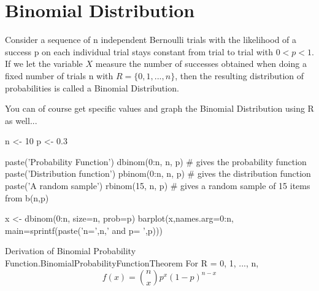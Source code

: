 \documentclass[10pt,]{book}
\numberwithin{equation}{section}
\newcommand{\lt}{<}
\begin{document}
\section[{Binomial Distribution}]{Binomial Distribution}\label{section-46}
\hypertarget{p-851}{}%
Consider a sequence  of n independent Bernoulli trials with the likelihood of a success p on each individual trial stays constant from trial to trial with \(0 \lt p \lt 1 \). If we let the variable \(X\) measure the number of successes obtained when doing a fixed number of trials n with \(R = \{ 0, 1, ..., n \}\), then the resulting distribution of probabilities is called a Binomial Distribution.%
\par
\hypertarget{p-852}{}%
\leavevmode%
%
\par
\hypertarget{p-853}{}%
You can of course get specific values and graph the Binomial Distribution using R as well...%
\par
\hypertarget{p-854}{}%
\leavevmode%
\begin{sageinput}
n <- 10
p <- 0.3

paste('Probability Function')
dbinom(0:n, n, p)   # gives the probability function
paste('Distribution function')
pbinom(0:n, n, p)   # gives the distribution function
paste('A random sample')
rbinom(15, n, p)    # gives a random sample of 15 items from b(n,p)

x <- dbinom(0:n, size=n, prob=p)
barplot(x,names.arg=0:n, main=sprintf(paste('n=',n,' and p= ',p)))
\end{sageinput}
%
\par
\hypertarget{p-855}{}%
\begin{theorem}{Derivation of Binomial Probability Function.}{}{BinomialProbabilityFunctionTheorem}%
\hypertarget{BinomialProbabilityFunction}{}%
For R = {0, 1, ..., n},%
\begin{equation*}
f(x) = \binom{n}{x}p^x(1-p)^{n-x}
\end{equation*}
%
\end{theorem}
\end{document}
